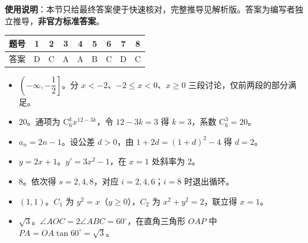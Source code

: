 
\begin{gknotice}
\textbf{使用说明}：本节只给最终答案便于快速核对，完整推导见解析版。答案为编写者独立推导，\textbf{非官方标准答案}。
\end{gknotice}

\begin{center}\begin{tabular}{ccccccccc}
\toprule
题号 & 1 & 2 & 3 & 4 & 5 & 6 & 7 & 8 \\
\midrule
答案 & D & C & A & A & B & C & D & C \\
\bottomrule
\end{tabular}\end{center}

\begin{itemize}[leftmargin=2.6em]
  \item[\textbf{9.}] $\left(-\infty,-\dfrac12\right]$。分 $x<-2$、$-2\leqslant x<0$、$x\geqslant0$ 三段讨论，仅前两段的部分满足。
  \item[\textbf{10.}] $20$。通项为 $\mathrm C_6^k x^{12-3k}$，令 $12-3k=3$ 得 $k=3$，系数 $\mathrm C_6^3=20$。
  \item[\textbf{11.}] $a_n=2n-1$。设公差 $d>0$，由 $1+2d=(1+d)^2-4$ 得 $d=2$。
  \item[\textbf{12.}] $y=2x+1$。$y'=3x^2-1$，在 $x=1$ 处斜率为 $2$。
  \item[\textbf{13.}] $8$。依次得 $s=2,4,8$，对应 $i=2,4,6$；$i=8$ 时退出循环。
  \item[\textbf{14.}] $(1,1)$。$C_1$ 为 $y^2=x$（$y\geqslant0$），$C_2$ 为 $x^2+y^2=2$，联立得 $x=1$。
  \item[\textbf{15.}] $\sqrt3$。$\angle AOC=2\angle ABC=60^\circ$，在直角三角形 $OAP$ 中 $PA=OA\tan60^\circ=\sqrt3$。
\end{itemize}

